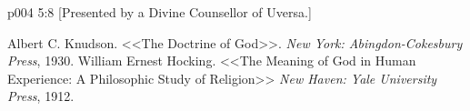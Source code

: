 \vsetoff
\vs p004 5:8 [Presented by a Divine Counsellor of Uversa.]
\quizlink
\begin{thebibliography}{100}
Albert C. Knudson.
{<<The Doctrine of God>>.}
{\em New York: Abingdon-Cokesbury Press}, 1930.
William Ernest Hocking.
{<<The Meaning of God in Human Experience: A Philosophic Study of Religion>>}
{\em New Haven: Yale University Press}, 1912.
\end{thebibliography}
